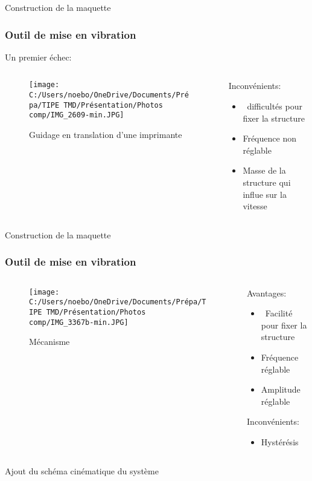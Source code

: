 \documentclass{beamer}
\begin{document}
\begin{frame}{Construction de la maquette}
		\frametitle{Outil de mise en vibration}
Un premier échec:
		\begin{columns}
			\begin{column}{0.5\textwidth}
				\begin{figure}
					\texttt{[image: C:/Users/noebo/OneDrive/Documents/Prépa/TIPE TMD/Présentation/Photos comp/IMG\_2609-min.JPG]}
					\caption{Guidage en translation d'une imprimante}
				\end{figure}
			\end{column}
			\begin{column}{0.5\textwidth}
				Inconvénients:
				\begin{itemize}
					\item\ difficultés pour fixer la structure
					\item Fréquence non réglable \\
					\item Masse de la structure qui influe sur la vitesse
				\end{itemize}

			\end{column}
		\end{columns}
	\end{frame}
	
	\begin{frame}{Construction de la maquette}
		\frametitle{Outil de mise en vibration}
 
		\begin{columns}
			\begin{column}{0.5\textwidth}
				\begin{figure}
					\texttt{[image: C:/Users/noebo/OneDrive/Documents/Prépa/TIPE TMD/Présentation/Photos comp/IMG\_3367b-min.JPG]}
					\caption{Mécanisme}
				\end{figure}
			\end{column}
			\begin{column}{0.5\textwidth}
				Avantages:
				\begin{itemize}
					\item\ Facilité pour fixer la structure
					\item Fréquence réglable \\
					\item Amplitude réglable 
				\end{itemize}
				\vspace{12pt}
				Inconvénients:
				
				\begin{itemize}
					\item Hystérésis
				\end{itemize}
			\end{column}
		\end{columns}
	Ajout du schéma cinématique du système
	\end{frame}
	
\end{document}
